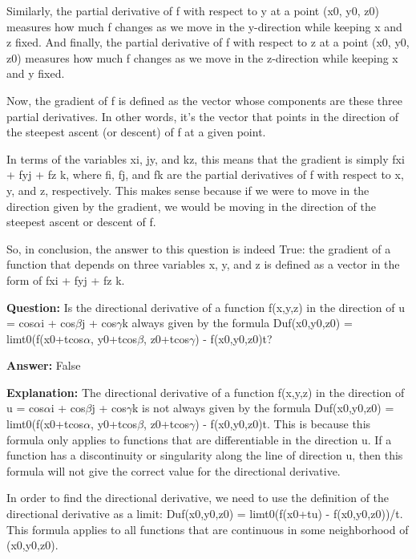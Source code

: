 \documentclass{article}
\begin{document}
Similarly, the partial derivative of f with respect to y at a point (x0, y0, z0) measures how much f changes as we move in the y-direction while keeping x and z fixed. And finally, the partial derivative of f with respect to z at a point (x0, y0, z0) measures how much f changes as we move in the z-direction while keeping x and y fixed.

Now, the gradient of f is defined as the vector whose components are these three partial derivatives. In other words, it's the vector that points in the direction of the steepest ascent (or descent) of f at a given point.

In terms of the variables xi, jy, and kz, this means that the gradient is simply fxi + fyj + fz k, where fi, fj, and fk are the partial derivatives of f with respect to x, y, and z, respectively. This makes sense because if we were to move in the direction given by the gradient, we would be moving in the direction of the steepest ascent or descent of f.

So, in conclusion, the answer to this question is indeed True: the gradient of a function that depends on three variables x, y, and z is defined as a vector in the form of fxi + fyj + fz k.
                
                \vspace{0.5cm} 
        
            
                \textbf {Question:} Is the directional derivative of a function f(x,y,z) in the direction of u = cos\ensuremath{\alpha}i + cos\ensuremath{\beta}j + cos\ensuremath{\gamma}k always given by the formula Duf(x0,y0,z0) = limt{\textrightarrow}0(f(x0+tcos\ensuremath{\alpha}, y0+tcos\ensuremath{\beta}, z0+tcos\ensuremath{\gamma}) - f(x0,y0,z0)t?
                
                \textbf{Answer:} False

                \textbf{Explanation:} The directional derivative of a function f(x,y,z) in the direction of u = cos\ensuremath{\alpha}i + cos\ensuremath{\beta}j + cos\ensuremath{\gamma}k is not always given by the formula Duf(x0,y0,z0) = limt{\textrightarrow}0(f(x0+tcos\ensuremath{\alpha}, y0+tcos\ensuremath{\beta}, z0+tcos\ensuremath{\gamma}) - f(x0,y0,z0)t. This is because this formula only applies to functions that are differentiable in the direction u. If a function has a discontinuity or singularity along the line of direction u, then this formula will not give the correct value for the directional derivative.

In order to find the directional derivative, we need to use the definition of the directional derivative as a limit: Duf(x0,y0,z0) = limt{\textrightarrow}0(f(x0+tu) - f(x0,y0,z0))/t. This formula applies to all functions that are continuous in some neighborhood of (x0,y0,z0).
                
\end{document}
